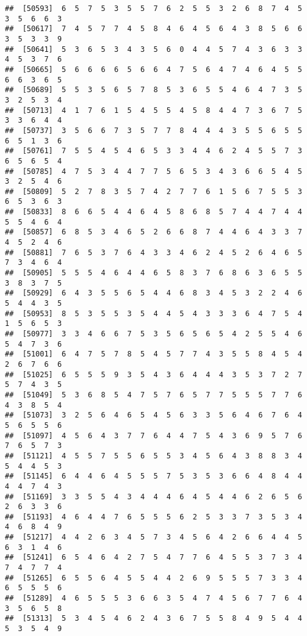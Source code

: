 \documentclass[
]{book}
\begin{document}
\begin{verbatim}
##  [50593]  6  5  7  5  3  5  5  7  6  2  5  5  3  2  6  8  7  4  5  3  5  6  6  3
##  [50617]  7  4  5  7  7  4  5  8  4  6  4  5  6  4  3  8  5  6  6  3  5  3  3  9
##  [50641]  5  3  6  5  3  4  3  5  6  0  4  4  5  7  4  3  6  3  3  4  5  3  7  6
##  [50665]  5  6  6  6  6  5  6  6  4  7  5  6  4  7  4  6  4  5  5  6  6  3  6  5
##  [50689]  5  5  3  5  6  5  7  8  5  3  6  5  5  4  6  4  7  3  5  3  2  5  3  4
##  [50713]  4  1  7  6  1  5  4  5  5  4  5  8  4  4  7  3  6  7  5  3  3  6  4  4
##  [50737]  3  5  6  6  7  3  5  7  7  8  4  4  4  3  5  5  6  5  5  6  5  1  3  6
##  [50761]  7  5  5  4  5  4  6  5  3  3  4  4  6  2  4  5  5  7  3  6  5  6  5  4
##  [50785]  4  7  5  3  4  4  7  7  5  6  5  3  4  3  6  6  5  4  5  3  2  5  4  6
##  [50809]  5  2  7  8  3  5  7  4  2  7  7  6  1  5  6  7  5  5  3  6  5  3  6  3
##  [50833]  8  6  6  5  4  4  6  4  5  8  6  8  5  7  4  4  7  4  4  5  5  4  6  4
##  [50857]  6  8  5  3  4  6  5  2  6  6  8  7  4  4  6  4  3  3  7  4  5  2  4  6
##  [50881]  7  6  5  3  7  6  4  3  3  4  6  2  4  5  2  6  4  6  5  7  3  4  6  4
##  [50905]  5  5  5  4  6  4  4  6  5  8  3  7  6  8  6  3  6  5  5  3  8  3  7  5
##  [50929]  6  4  3  5  5  6  5  4  4  6  8  3  4  5  3  2  2  4  6  5  4  4  3  5
##  [50953]  8  5  3  5  5  3  5  4  4  5  4  3  3  3  6  4  7  5  4  1  5  6  5  3
##  [50977]  3  3  4  6  6  7  5  3  5  6  5  6  5  4  2  5  5  4  6  5  4  7  3  6
##  [51001]  6  4  7  5  7  8  5  4  5  7  7  4  3  5  5  8  4  5  4  2  6  7  6  6
##  [51025]  6  5  5  5  9  3  5  4  3  6  4  4  4  3  5  3  7  2  7  5  7  4  3  5
##  [51049]  5  3  6  8  5  4  7  5  7  6  5  7  7  5  5  5  7  7  6  4  3  8  5  4
##  [51073]  3  2  5  6  4  6  5  4  5  6  3  3  5  6  4  6  7  6  4  5  6  5  5  6
##  [51097]  4  5  6  4  3  7  7  6  4  4  7  5  4  3  6  9  5  7  6  7  6  5  7  3
##  [51121]  4  5  5  7  5  5  6  5  5  3  4  5  6  4  3  8  8  3  4  5  4  4  5  3
##  [51145]  6  4  4  6  4  5  5  5  7  5  3  5  3  6  6  4  8  4  4  4  4  7  4  3
##  [51169]  3  3  5  5  4  3  4  4  4  6  4  5  4  4  6  2  6  5  6  2  6  3  3  6
##  [51193]  4  6  4  4  7  6  5  5  5  6  2  5  3  3  7  3  5  3  4  4  6  8  4  9
##  [51217]  4  4  2  6  3  4  5  7  3  4  5  6  4  2  6  6  4  4  5  6  3  1  4  6
##  [51241]  6  5  4  6  4  2  7  5  4  7  7  6  4  5  5  3  7  3  4  7  4  7  7  4
##  [51265]  6  5  5  6  4  5  5  4  4  2  6  9  5  5  5  7  3  3  4  6  5  5  5  6
##  [51289]  4  6  5  5  5  3  6  6  3  5  4  7  4  5  6  7  7  6  4  3  5  6  5  8
##  [51313]  5  3  4  5  4  6  2  4  3  6  7  5  5  8  4  9  5  4  4  5  3  5  4  9

\end{verbatim}
\end{document}

